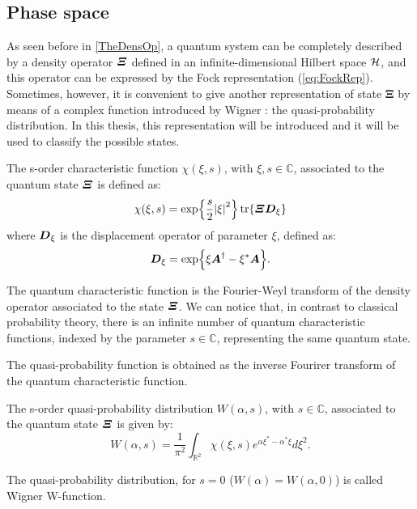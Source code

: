     \subsection{Phase space}
        As seen before in \ref{TheDensOp}, a quantum system can be completely
        described by a density operator $\bm{\relax{\varXi}}$ defined in an infinite-dimensional Hilbert space
        $\mathcal{H}$, and this operator can be expressed by the Fock representation (\ref{eq:FockRep}).
        Sometimes, however, it is convenient to give another representation of state $\pmb{\Xi}$ by
        means of a complex function introduced by Wigner \cite{Wigner}: the quasi-probability 
        distribution. In this thesis, this representation will be introduced and it will be used to
        classify the possible states.

        \begin{definition}
            The s-order characteristic function $\mathcal{\chi}(\xi,s)$, with $\xi,s\in\mathbb{C}$,
            associated to the quantum state $\bm{\relax{\varXi}}$ is defined as:
            \begin{equation}
                \mathcal{\chi}(\xi,s)=\exp{\frac{s}{2}\absolutevalue{\xi}^2}
                \tr{\Operator{\varXi}\Operator{D}_\xi}
            \end{equation}
            where $\bm{\relax{D}}_\xi$ is  the displacement operator of parameter $\xi$, defined as:
            \begin{equation}
                \bm{\relax{D}}_\xi=\exp{\xi\bm{\relax{A}}^\dagger-\xi^*\bm{\relax{A}}}.
            \end{equation}
        \end{definition}
        The quantum characteristic function is the Fourier-Weyl transform of the density operator 
        associated to the state $\bm{\relax{\varXi}}$. We can notice that, in contrast to classical 
        probability theory, there is an infinite number of quantum characteristic functions, 
        indexed by the parameter $s \in \mathbb{C}$, representing the same quantum state.

        The quasi-probability function is obtained as the inverse Fourirer transform of the 
        quantum characteristic function.
        \begin{definition}
            The s-order quasi-probability distribution $W(\alpha,s)$, with $s\in\mathbb{C}$,
            associated to the quantum state $\bm{\relax{\varXi}}$ is given by:
            \begin{equation*}
                W(\alpha,s)=\frac{1}{\pi^2}\int_{\mathbb{R}^2} 
                \mathcal{\chi}(\xi,s)e^{\alpha\xi^*-\alpha^*\xi}d\xi^2.
            \end{equation*}

        \end{definition}
        The quasi-probability distribution, for $s=0$ ($W(\alpha)=W(\alpha,0)$) is called 
        Wigner W-function.